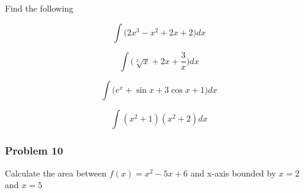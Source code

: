 \documentclass[
  letterpaper,
  DIV=11,
  numbers=noendperiod]{scrartcl}
\begin{document}
Find the following

\[\int \bigg(2x^3 - x^2 + 2x + 2 \bigg) dx\]

\hfill\break
\hfill\break
\hfill\break
\hfill\break
\hfill\break
\hfill\break
\hfill\break
\hfill\break
\hfill\break
\hfill\break

\[\int \bigg( \sqrt[3] x + 2x + \frac{3}{x}\bigg) dx\]
\thispagestyle{empty}

\hfill\break
\hfill\break
\hfill\break
\hfill\break
\hfill\break
\hfill\break
\hfill\break
\hfill\break
\hfill\break
\hfill\break

\thispagestyle{empty}

\[\int \bigg( e^x + \sin x  + 3 \cos x + 1\bigg) dx\]

\hfill\break
\hfill\break
\hfill\break
\hfill\break
\hfill\break
\hfill\break
\hfill\break
\hfill\break
\hfill\break
\hfill\break

\[\int ( x^2  + 1)(x^2+2 ) dx\]

\hfill\break
\hfill\break
\hfill\break
\hfill\break
\hfill\break
\hfill\break
\hfill\break
\hfill\break

\thispagestyle{empty}

\subsubsection{Problem 10}\label{problem-10}

Calculate the area between \(f(x) = x^2 -5x + 6\) and x-axis bounded by
\(x = 2\) and \(x = 5\)

\thispagestyle{empty}
\end{document}
